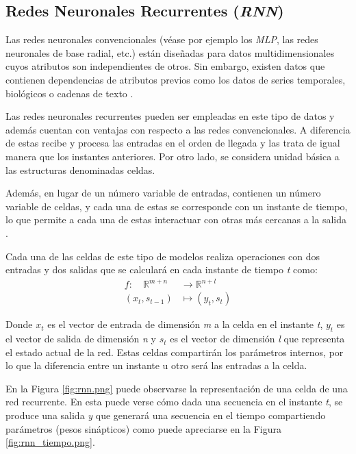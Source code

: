 \subsection{Redes Neuronales Recurrentes (\textit{RNN})}
Las redes neuronales convencionales (véase por ejemplo los \textit{MLP}, las redes neuronales de base radial, etc.) están diseñadas para
datos multidimensionales cuyos atributos son independientes de otros.
Sin embargo, existen datos que contienen dependencias de atributos previos como los datos de series temporales, 
biológicos o cadenas de texto \cite{book:aggarwal2018}.

Las redes neuronales recurrentes pueden ser empleadas en este tipo de datos y además cuentan con ventajas con respecto a las redes convencionales.
A diferencia de estas recibe y procesa las entradas en el orden de llegada y las trata de igual manera que los instantes anteriores.
Por otro lado, se considera unidad básica a las estructuras denominadas celdas.

Además, en lugar de un número variable de entradas, contienen un número variable de celdas, y cada una de estas se corresponde con un 
instante de tiempo, lo que permite a cada una de estas interactuar con otras más cercanas a la salida \cite{book:aggarwal2018}.

Cada una de las celdas de este tipo de modelos realiza operaciones con dos entradas y dos salidas que se calculará en cada instante de tiempo \textit{t} como:
\begin{equation}
    \begin{aligned}
    f: \quad \mathbb{R}^{m+n} & \rightarrow \mathbb{R}^{n+l} \\
    \left(x_t, s_{t-1}\right) & \mapsto\left(y_t, s_t\right)
    \end{aligned}
\end{equation}

Donde \(x_t\) es el vector de entrada de dimensión \textit{m} a la celda en el instante \textit{t}, \(y_{t}\) es el vector de salida de 
dimensión \textit{n} y \(s_{t}\) es el vector de dimensión \textit{l} que representa el estado actual de la red.
Estas celdas compartirán los parámetros internos, por lo que la diferencia entre un instante u otro será las entradas a la celda.


En la Figura \ref{fig:rnn.png} puede observarse la representación de una celda de una red recurrente. En
esta puede verse cómo dada una secuencia en el instante \textit{t}, se produce una salida 
\textit{y} que generará una secuencia en el tiempo compartiendo parámetros (pesos sinápticos) como puede apreciarse
en la Figura \ref{fig:rnn_tiempo.png}.

